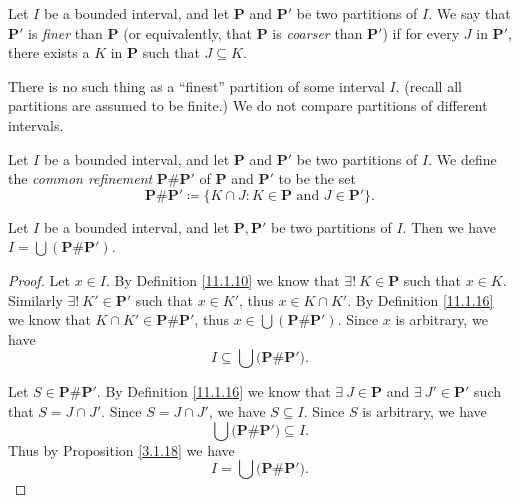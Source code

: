 \begin{definition}\label{11.1.14}
    Let \(I\) be a bounded interval, and let \(\mathbf{P}\) and \(\mathbf{P}'\) be two partitions of \(I\).
    We say that \(\mathbf{P}'\) is \emph{finer} than \(\mathbf{P}\) (or equivalently, that \(\mathbf{P}\) is \emph{coarser} than \(\mathbf{P}'\)) if for every \(J\) in \(\mathbf{P}'\), there exists a \(K\) in \(\mathbf{P}\) such that \(J \subseteq K\).
\end{definition}

\begin{note}
    There is no such thing as a ``finest'' partition of some interval \(I\).
    (recall all partitions are assumed to be finite.)
    We do not compare partitions of different intervals.
\end{note}

\setcounter{theorem}{15}
\begin{definition}\label{11.1.16}
    Let \(I\) be a bounded interval, and let \(\mathbf{P}\) and \(\mathbf{P}'\) be two partitions of \(I\).
    We define the \emph{common refinement} \(\mathbf{P} \# \mathbf{P}'\) of \(\mathbf{P}\) and \(\mathbf{P}'\) to be the set
    \[
        \mathbf{P} \# \mathbf{P}' \coloneqq \{K \cap J : K \in \mathbf{P} \text{ and } J \in \mathbf{P}'\}.
    \]
\end{definition}

\begin{additional corollary}\label{ac 11.1.1}
Let \(I\) be a bounded interval, and let \(\mathbf{P}, \mathbf{P}'\) be two partitions of \(I\).
Then we have \(I = \bigcup (\mathbf{P} \# \mathbf{P}')\).
\end{additional corollary}

\begin{proof}
    Let \(x \in I\).
    By Definition \ref{11.1.10} we know that \(\exists!\ K \in \mathbf{P}\) such that \(x \in K\).
    Similarly \(\exists!\ K' \in \mathbf{P}'\) such that \(x \in K'\), thus \(x \in K \cap K'\).
    By Definition \ref{11.1.16} we know that \(K \cap K' \in \mathbf{P} \# \mathbf{P}'\), thus \(x \in \bigcup (\mathbf{P} \# \mathbf{P}')\).
    Since \(x\) is arbitrary, we have
    \[
        I \subseteq \bigcup \big(\mathbf{P} \# \mathbf{P}'\big).
    \]

    Let \(S \in \mathbf{P} \# \mathbf{P}'\).
    By Definition \ref{11.1.16} we know that \(\exists\ J \in \mathbf{P}\) and \(\exists\ J' \in \mathbf{P}'\) such that \(S = J \cap J'\).
    Since \(S = J \cap J'\), we have \(S \subseteq I\).
    Since \(S\) is arbitrary, we have
    \[
        \bigcup \big(\mathbf{P} \# \mathbf{P}'\big) \subseteq I.
    \]
    Thus by Proposition \ref{3.1.18} we have
    \[
        I = \bigcup \big(\mathbf{P} \# \mathbf{P}'\big).
    \]
\end{proof}

